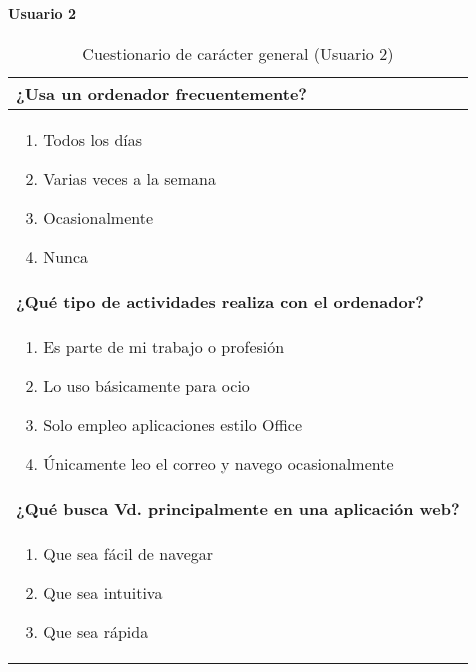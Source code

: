 \paragraph*{Usuario 2}
\begin{table}[H]
\centering
\caption{Cuestionario de carácter general (Usuario 2)}
\begin{tabular}{p{36em}}
\toprule
\rowcolor[rgb]{ .949,  .949,  .949} \textbf{¿Usa un ordenador frecuentemente?} \\ \midrule
\vspace{-4mm}
\begin{enumerate}
\item  \colorbox{blue!30}{Todos los días}
\item Varias veces a la semana
\item Ocasionalmente
\item Nunca
\end{enumerate} \\ \midrule
\rowcolor[rgb]{ .949,  .949,  .949} \textbf{¿Qué tipo de actividades realiza con el ordenador?} \\ \midrule
\vspace{-4mm}
\begin{enumerate}
\item  \colorbox{blue!30}{Es parte de mi trabajo o profesión}
\item Lo uso básicamente para ocio
\item Solo empleo aplicaciones estilo Office
\item Únicamente leo el correo y navego ocasionalmente
\end{enumerate} \\ \midrule
\rowcolor[rgb]{ .949,  .949,  .949} \textbf{¿Qué busca Vd. principalmente en una aplicación web?} \\ \midrule
\vspace{-4mm}
\begin{enumerate}
\item  \colorbox{blue!30}{Que sea fácil de navegar}
\item Que sea intuitiva
\item Que sea rápida
\end{enumerate} \\ \bottomrule
\end{tabular}
\end{table}

